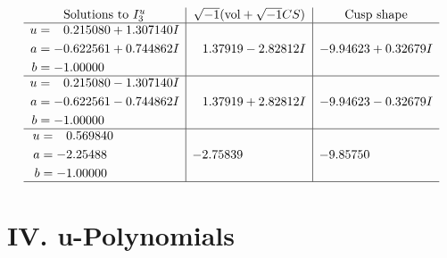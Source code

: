 \documentclass[1p]{elsarticle_modified}
\theoremstyle{definition}
\newcommand{\I}{\sqrt{-1}}
\begin{document}
$$\begin{array}{c|c|c}  
\text{Solutions to }I^u_{3}& \I (\text{vol} + \sqrt{-1}CS) & \text{Cusp shape}\\
 \hline 
\begin{aligned}
u &= \phantom{-}0.215080 + 1.307140 I \\
a &= -0.622561 + 0.744862 I \\
b &= -1.00000\phantom{ +0.000000I}\end{aligned}
 & \phantom{-}1.37919 - 2.82812 I & -9.94623 + 0.32679 I \\ \hline\begin{aligned}
u &= \phantom{-}0.215080 - 1.307140 I \\
a &= -0.622561 - 0.744862 I \\
b &= -1.00000\phantom{ +0.000000I}\end{aligned}
 & \phantom{-}1.37919 + 2.82812 I & -9.94623 - 0.32679 I \\ \hline\begin{aligned}
u &= \phantom{-}0.569840\phantom{ +0.000000I} \\
a &= -2.25488\phantom{ +0.000000I} \\
b &= -1.00000\phantom{ +0.000000I}\end{aligned}
 & -2.75839\phantom{ +0.000000I} & -9.85750\phantom{ +0.000000I}\\
 \hline 
 \end{array}$$\newpage
\newpage\renewcommand{\arraystretch}{1}
\centering \section*{ IV. u-Polynomials}
\end{document}
